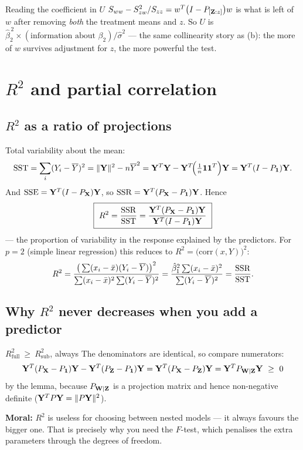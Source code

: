 \documentclass[11pt]{article}
\begin{document}
\begin{idea}{Reading the coefficient in $U$}
$S_{ww}-S_{zw}^2/S_{zz}=w^T\big(I-P_{[\mathbf{Z}:z]}\big)w$ is what is left of $w$ after removing
\emph{both} the treatment means and $z$. So $U$ is
$\hat\beta_2^{\,2}\times(\text{information about }\beta_2)/\hat\sigma^2$ --- the same
collinearity story as (b): the more of $w$ survives adjustment for $z$, the more powerful the
test.
\end{idea}

\section{$R^2$ and partial correlation}

\subsection{$R^2$ as a ratio of projections}

Total variability about the mean:
\[
  \mathrm{SST}=\sum_i(Y_i-\overline{Y})^2=\|\mathbf{Y}\|^2-n\overline{Y}^2
  =\mathbf{Y}^T\mathbf{Y}-\mathbf{Y}^T\!\Big(\tfrac1n\mathbf{1}\mathbf{1}^T\Big)\mathbf{Y}=\mathbf{Y}^T(I-P_{\mathbf{1}})\mathbf{Y} .
\]
And $\mathrm{SSE}=\mathbf{Y}^T(I-P_{\mathbf{X}})\mathbf{Y}$, so $\mathrm{SSR}=\mathbf{Y}^T(P_{\mathbf{X}}-P_{\mathbf{1}})\mathbf{Y}$. Hence
\[
  \boxed{\ R^2=\frac{\mathrm{SSR}}{\mathrm{SST}}=\frac{\bY^T(P_\bX-P_{\one})\bY}{\bY^T(I-P_{\one})\bY}\ }
\]
--- the proportion of variability in the response explained by the predictors. For $p=2$
(simple linear regression) this reduces to $R^2=\big(\text{corr}(x,Y)\big)^2$:
\[
  R^2=\frac{\big(\sum(x_i-\bar{x})(Y_i-\overline{Y})\big)^2}{\sum(x_i-\bar{x})^2\sum(Y_i-\overline{Y})^2}
     =\frac{\hat\beta_1^2\sum(x_i-\bar{x})^2}{\sum(Y_i-\overline{Y})^2}=\frac{\mathrm{SSR}}{\mathrm{SST}} .
\]

\subsection{Why $R^2$ never decreases when you add a predictor}

\begin{idea}{$R^2_{\text{full}}\ \ge\ R^2_{\text{sub}}$, always}
The denominators are identical, so compare numerators:
\[
  \mathbf{Y}^T(P_{\mathbf{X}}-P_{\mathbf{1}})\mathbf{Y}-\mathbf{Y}^T(P_{\mathbf{Z}}-P_{\mathbf{1}})\mathbf{Y}=\mathbf{Y}^T(P_{\mathbf{X}}-P_{\mathbf{Z}})\mathbf{Y}
  =\mathbf{Y}^TP_{\mathbf{W}\mid\mathbf{Z}}\mathbf{Y}\ \ge\ 0
\]
by the lemma, because $P_{\mathbf{W}\mid\mathbf{Z}}$ is a projection matrix and hence non-negative
definite ($\mathbf{Y}^TP\mathbf{Y}=\|P\mathbf{Y}\|^2$).
\end{idea}

\textbf{Moral:} $R^2$ is useless for choosing between nested models --- it always favours the
bigger one. That is precisely why you need the $F$-test, which penalises the extra
parameters through the degrees of freedom.
\end{document}
